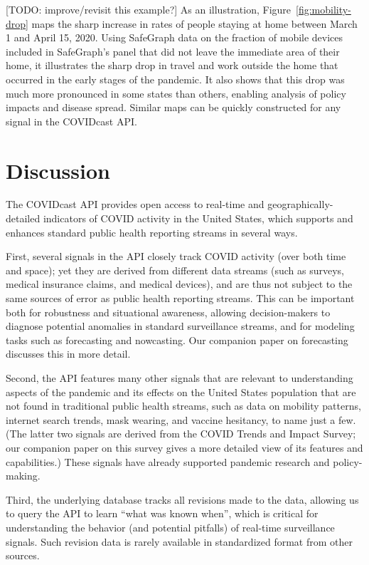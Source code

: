 \documentclass[9pt,twocolumn,twoside,lineno]{pnas-new}
\begin{document}
[TODO: improve/revisit this example?]
As an illustration, Figure~\ref{fig:mobility-drop} maps the sharp increase in
rates of people staying at home between March 1 and April 15, 2020. Using
SafeGraph data on the fraction of mobile devices included in SafeGraph's panel
that did not leave the immediate area of their home, it illustrates the sharp
drop in travel and work outside the home that occurred in the early stages of
the pandemic. It also shows that this drop was much more pronounced in some
states than others, enabling analysis of policy impacts and disease spread.
Similar maps can be quickly constructed for any signal in the COVIDcast API.

\section{Discussion}

The COVIDcast API provides open access to real-time and geographically-detailed
indicators of COVID activity in the United States, which supports and enhances
standard public health reporting streams in several ways.

First, several signals in the API closely track COVID activity (over both time
and space); yet they are derived from different data streams (such as surveys,
medical insurance claims, and medical devices), and are thus not subject to the
same sources of error as public health reporting streams. This can be important
both for robustness and situational awareness, allowing decision-makers to
diagnose potential anomalies in standard surveillance streams, and for modeling
tasks such as forecasting and nowcasting. Our companion paper on forecasting
discusses this in more detail.

Second, the API features many other signals that are relevant to understanding
aspects of the pandemic and its effects on the United States population that are
not found in traditional public health streams, such as data on mobility
patterns, internet search trends, mask wearing, and vaccine hesitancy, to name
just a few. (The latter two signals are derived from the COVID Trends and Impact
Survey; our companion paper on this survey gives a more detailed view of its
features and capabilities.) These signals have already supported pandemic
research and  policy-making.

Third, the underlying database tracks all revisions made to the data, allowing
us to query the API to learn ``what was known when'', which is critical for
understanding the behavior (and potential pitfalls) of real-time surveillance
signals. Such revision data is rarely available in standardized format from
other sources.
\end{document}

